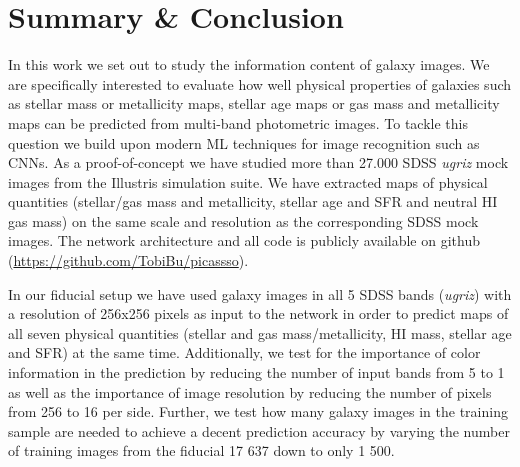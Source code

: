 \documentclass[useAMS,usenatbib]{mnras}
\begin{document}


\section{Summary \& Conclusion} 
\label{sec:concl}

In this work we set out to study the information content of galaxy images. We are specifically interested to evaluate how well physical properties of galaxies such as stellar mass or metallicity maps, stellar age maps or gas mass and metallicity maps can be predicted from multi-band photometric images. To tackle this question we build upon modern ML techniques for image recognition such as CNNs. As a proof-of-concept we have studied more than 27.000 SDSS \emph{ugriz} mock images from the Illustris simulation suite. We have extracted maps of physical quantities (stellar/gas mass and metallicity, stellar age and SFR and neutral HI gas mass) on the same scale and resolution as the corresponding SDSS mock images. The network architecture and all code is publicly available on github (\url{https://github.com/TobiBu/picassso}).

In our fiducial setup we have used galaxy images in all 5 SDSS bands (\emph{ugriz}) with a resolution of 256x256 pixels as input to the network in order to predict maps of all seven physical quantities (stellar and gas mass/metallicity, HI mass, stellar age and SFR) at the same time. Additionally, we test for the importance of color information in the prediction by reducing the number of input bands from 5 to 1 as well as the importance of image resolution by reducing the number of pixels from 256 to 16 per side. Further, we test how many galaxy images in the training sample are needed to achieve a decent prediction accuracy by varying the number of training images from the fiducial 17 637 down to only 1 500. 
\end{document}
